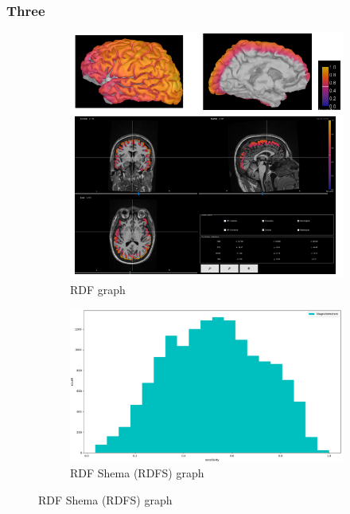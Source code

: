 \documentclass{beamer}
\numberwithin{figure}{section}
\numberwithin{equation}{section}
\begin{document}
\section{}
\begin{frame}
 \frametitle{Three}
  

 	\begin{figure}[h]
        \begin{subfigure}[h]{0.53\linewidth} 
            \includegraphics[width=\linewidth]{pictures/meg3}
            \caption{\tiny RDF graph}
            \label{fig:rdf_graph}
        \end{subfigure}       
        \begin{subfigure}[h]{0.45\linewidth} 
            \includegraphics[width=\linewidth]{pictures/HISTmeg0.png}
            \caption{\tiny RDF Shema (RDFS) graph}
            \label{fig:rdfs_graph}
        \end{subfigure}
    \end{figure}

  
\end{frame}
\end{document}
